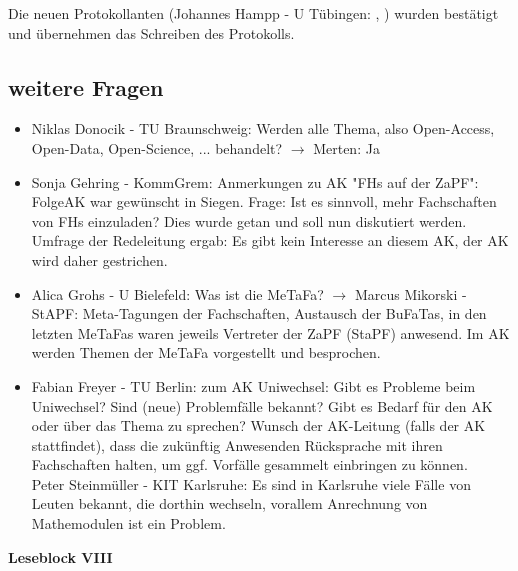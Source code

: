     \begin{info}{}
      Die neuen Protokollanten (Johannes Hampp - U Tübingen: , ) wurden bestätigt und übernehmen das Schreiben des Protokolls.
    \end{info}

  \subsection{weitere Fragen}
    \begin{itemize}
      \item Niklas Donocik - TU Braunschweig:  Werden alle Thema, also Open-Access, Open-Data, Open-Science, ... behandelt? $\rightarrow$ Merten: Ja
      \item Sonja Gehring - KommGrem:  Anmerkungen zu AK "FHs auf der ZaPF": FolgeAK war gewünscht in Siegen. Frage: Ist es sinnvoll, mehr Fachschaften von FHs einzuladen?
        Dies wurde getan und soll nun diskutiert werden. Umfrage der Redeleitung ergab: Es gibt kein Interesse an diesem AK, der AK wird daher gestrichen.
      \item Alica Grohs - U Bielefeld:  Was ist die MeTaFa? $\rightarrow$ Marcus Mikorski - StAPF:  Meta-Tagungen der Fachschaften, Austausch der BuFaTas, in den letzten MeTaFas
        waren jeweils Vertreter der ZaPF (StaPF) anwesend. Im AK werden Themen der MeTaFa vorgestellt und besprochen.
      \item Fabian Freyer - TU Berlin:  zum AK Uniwechsel: Gibt es Probleme beim Uniwechsel? Sind (neue) Problemfälle bekannt? Gibt es Bedarf für den AK oder über das Thema zu sprechen?
        Wunsch der AK-Leitung (falls der AK stattfindet), dass die zukünftig Anwesenden Rücksprache mit ihren Fachschaften halten, um ggf. Vorfälle gesammelt einbringen zu können. \\
        Peter Steinmüller - KIT Karlsruhe:  Es sind in Karlsruhe viele Fälle von Leuten bekannt, die dorthin wechseln, vorallem Anrechnung von Mathemodulen ist ein Problem.
    \end{itemize}

    \textbf{Leseblock VIII} \\


